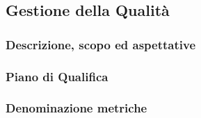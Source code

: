 \subsection{Gestione della Qualità}

\subsubsection{Descrizione, scopo ed aspettative}

\subsubsection{Piano di Qualifica}

\subsubsection{Denominazione metriche}